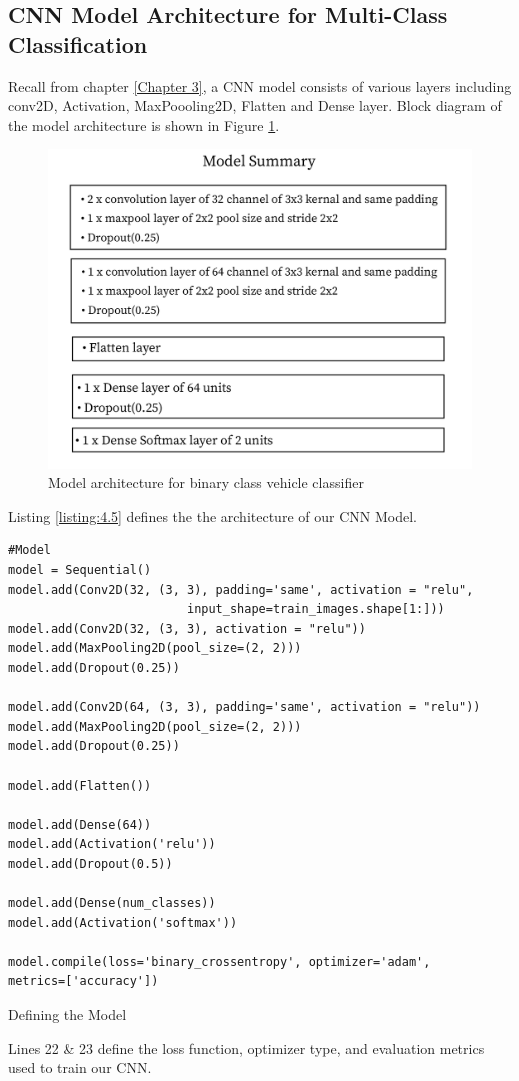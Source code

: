 \subsection{CNN Model Architecture for Multi-Class Classification}
Recall from chapter \ref{Chapter 3}, a CNN model consists of various layers including
conv2D, Activation, MaxPoooling2D, Flatten and Dense layer.
Block diagram of the model architecture is shown in Figure \ref{fig:model_summary_2}. 
\begin{figure}[H]
    \centering
    \captionsetup{justification = centering}
    \includegraphics[scale = 1]{CHAPTERS/Chapter-4/Images/model_summary_2}
    \caption{Model architecture for binary class vehicle classifier} 
    \label{fig:model_summary_2}
\end{figure}
\noindent Listing \ref{listing:4.5}
defines the the architecture of our CNN Model.
\begin{longlisting}
    \begin{verbatim}
#Model
model = Sequential()
model.add(Conv2D(32, (3, 3), padding='same', activation = "relu",
                         input_shape=train_images.shape[1:]))
model.add(Conv2D(32, (3, 3), activation = "relu"))
model.add(MaxPooling2D(pool_size=(2, 2)))
model.add(Dropout(0.25))   

model.add(Conv2D(64, (3, 3), padding='same', activation = "relu"))
model.add(MaxPooling2D(pool_size=(2, 2)))
model.add(Dropout(0.25)) 
     
model.add(Flatten())

model.add(Dense(64))
model.add(Activation('relu'))
model.add(Dropout(0.5)) 

model.add(Dense(num_classes))
model.add(Activation('softmax'))

model.compile(loss='binary_crossentropy', optimizer='adam',
metrics=['accuracy'])
    \end{verbatim}
    \caption{Defining the Model}
\label{listing:4.5}
\end{longlisting}
\noindent Lines 22 \& 23 define the loss function,
optimizer type, and evaluation metrics used to train our CNN.
